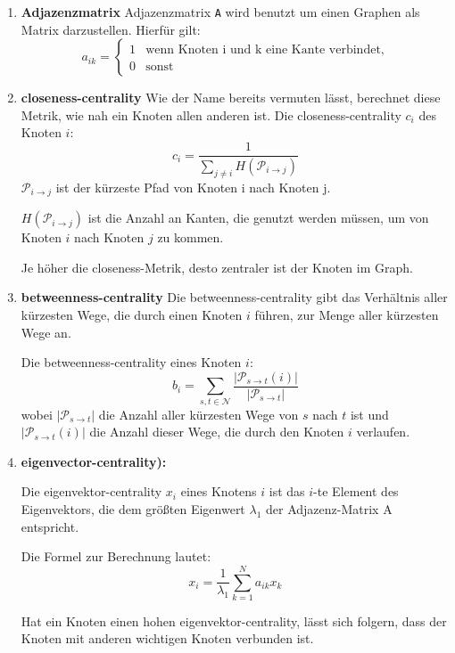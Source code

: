\documentclass[sigconf, nonacm, review]{acmart}
\begin{document}
\begin{enumerate}
\item \textbf{Adjazenzmatrix}
Adjazenzmatrix \texttt{A} wird benutzt um einen Graphen als Matrix darzustellen.
Hierf\"ur gilt:
\[
a_{ik} = \begin{cases} 1 & \text{wenn Knoten i und k eine Kante verbindet}, \\ 0 & \text{sonst} \end{cases}
\]
\item \textbf{closeness-centrality}
Wie der Name bereits vermuten l\"asst, berechnet diese Metrik, 
wie nah ein Knoten allen anderen ist.
Die closeness-centrality $c_i$ des Knoten $i$:
\[
    c_i = \frac{1}{\sum_{j\neq i} H(\mathcal{P}_{i\rightarrow j})}
\]
$\mathcal{P}_{i\rightarrow j}$ ist der k\"urzeste Pfad von Knoten i nach Knoten j.
    
$H(\mathcal{P}_{i\rightarrow j})$ ist die Anzahl an Kanten, die genutzt werden m\"ussen, um von Knoten $i$ nach Knoten $j$ zu kommen.
    
Je h\"oher die closeness-Metrik, desto zentraler ist der Knoten im Graph. 
    
\item \textbf{betweenness-centrality}
Die betweenness-centrality gibt das Verh\"altnis aller k\"urzesten Wege, 
die durch einen Knoten $i$ f\"uhren, zur Menge aller k\"urzesten Wege an.
    
Die betweenness-centrality eines Knoten $i$:
\[
b_i = \sum_{s,t\in \mathcal{N}} \frac{|\mathcal{P}_{s\rightarrow t}(i)|}{|\mathcal{P}_{s\rightarrow t}|}
\]
wobei $|\mathcal{P}_{s\rightarrow t}|$ die Anzahl aller k\"urzesten Wege von $s$ nach $t$ ist und $|\mathcal{P}_{s\rightarrow t}(i)|$ die Anzahl dieser Wege, die durch den Knoten $i$ verlaufen. 
      
\item \textbf{eigenvector-centrality):}
     
 Die eigenvektor-centrality $x_i$ eines Knotens $i$ ist das $i$-te Element des Eigenvektors, 
 die dem gr\"o\ss ten Eigenwert $\lambda_1$ der Adjazenz-Matrix A entspricht.
     
Die Formel zur Berechnung lautet:
\[
x_i = \frac{1}{\lambda_1}\sum^N_{k=1}a_{ik}x_k
\]
     
Hat ein Knoten einen hohen eigenvektor-centrality, 
l\"asst sich folgern, dass der Knoten mit anderen wichtigen Knoten verbunden ist.

\end{enumerate}
\end{document}
